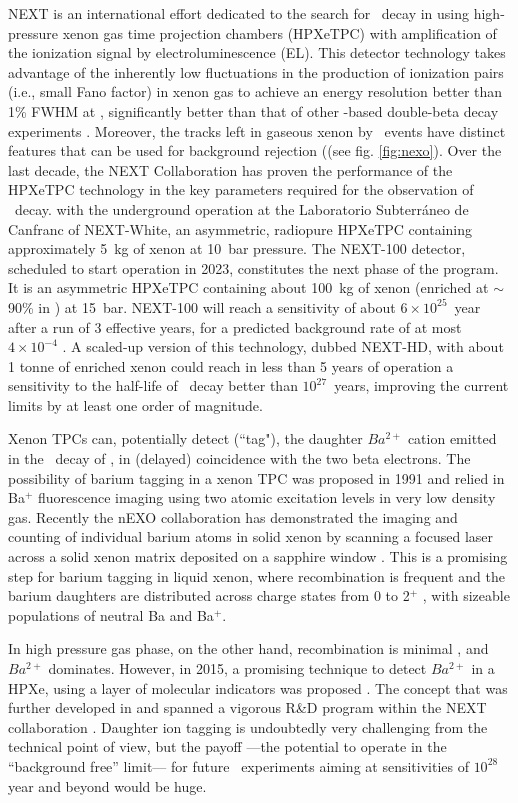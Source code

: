   
NEXT \cite{NEXT:2015wlq, NEXT:2020amj} is an international effort dedicated to the search for \bbonu\ decay in  using high-pressure xenon gas time projection chambers (HPXeTPC) with amplification of the ionization signal by electroluminescence (EL). This detector technology takes advantage of the inherently low fluctuations in the production of ionization pairs (i.e., small Fano factor) in xenon gas to achieve an energy resolution better than 1\% FWHM at \Qbb, significantly better than that of other -based double-beta decay experiments \cite{Nygren:2009zz}. Moreover, the tracks left in gaseous xenon by \bbonu\ events have distinct features that can be used for background rejection ((see fig. \ref{fig:nexo}). Over the last decade, the NEXT Collaboration has proven the performance of the HPXeTPC technology in the key parameters required for the observation of \bbonu\ decay. with the underground operation at the Laboratorio Subterráneo de Canfranc of NEXT-{\sc White}, an asymmetric, radiopure HPXeTPC containing approximately 5~kg of xenon at 10~bar pressure. 
The NEXT-100 detector, scheduled to start operation in 2023, constitutes the next phase of the program. It is an asymmetric HPXeTPC containing about 100~kg of xenon (enriched at $\sim$90\% in ) at 15~bar. NEXT-100 will reach a sensitivity of about $6\times10^{25}$~year after a run of 3 effective years, for a predicted background rate of at most $4\times10^{-4}$ \ckky. A scaled-up version of this technology, dubbed NEXT-HD, with about 1 tonne of enriched xenon could reach in less than 5 years of operation a sensitivity to the half-life of \bbonu\ decay better than $10^{27}$~years, improving the current limits by at least one order of magnitude. 

Xenon TPCs can, potentially detect (``tag"), the daughter $Ba^{2+}$ cation emitted in the \bbonu\ decay of , in (delayed) coincidence with the two beta electrons. 
The possibility of barium tagging in a xenon TPC was proposed in 1991\cite{Moe:1991ik} and relied in Ba$^+$ fluorescence imaging using two atomic excitation levels in very low density gas. Recently
the nEXO collaboration has demonstrated the imaging and counting of individual barium atoms in solid xenon by scanning a focused laser across a solid xenon matrix deposited on a sapphire window \cite{Chambers:2018srx}. This is a promising step for barium tagging in liquid xenon, where recombination is frequent and the barium daughters are distributed across charge states from 0 to 2$^+$ \cite{PhysRevC.92.045504}, with sizeable populations of neutral Ba and  Ba$^+$.  

In high pressure gas phase, on the other hand, recombination is minimal \cite{1997NIMPA.396..360B}, and $Ba^{2+}$ dominates. However, in 2015, a promising technique to detect $Ba^{2+}$ in a HPXe, using a layer of molecular indicators was
proposed \cite{Nygren_2015}. The concept that was further developed in \cite{Jones:2016qiq} and spanned a vigorous R\&D program within the NEXT collaboration \cite{McDonald:2017izm,Rivilla:2020cvm}. 
Daughter ion tagging is undoubtedly very challenging from the technical point of view, but the payoff ---the potential to operate in the ``background free'' limit--- for future \bbonu\ experiments aiming at sensitivities of $10^{28}$ year and beyond  would be huge.